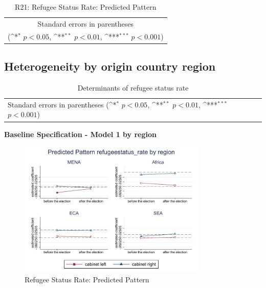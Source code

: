 \documentclass[10pt,a4paper]{scrartcl}
\begin{document}
\begin{table}[!ht]\centering
	\footnotesize
	\renewcommand{\arraystretch}{1.15}
	\def\sym#1{\ifmmode^{#1}\else\(^{#1}\)\fi}
	\caption{R21: Refugee Status Rate: Predicted Pattern}
	\begin{tabular}{l*{2}{c}}
		\hline\hline
		
		\hline\hline
		\multicolumn{3}{c}{\footnotesize Standard errors in parentheses} \\
		\multicolumn{3}{c}{\footnotesize (\sym{*} \(p<0.05\), \sym{**} \(p<0.01\), \sym{***} \(p<0.001\))} \\
	\end{tabular}
\end{table}


\clearpage
\FloatBarrier
\subsection{Heterogeneity by origin country region}
\begin{table}[!ht]\centering
	\renewcommand{\arraystretch}{1.25}
	\small
	\def\sym#1{\ifmmode^{#1}\else\(^{#1}\)\fi}
	\caption{Determinants of refugee status rate}
	\begin{tabular}{l*{4}{c}}
		\hline\hline
		
		\hline\hline
		\multicolumn{5}{l}{\footnotesize Standard errors in parentheses (\sym{*} \(p<0.05\), \sym{**} \(p<0.01\), \sym{***} \(p<0.001\))}\\
	\end{tabular}
\end{table}

\clearpage
\textbf{Baseline Specification - Model 1 by region}
\begin{figure}[!ht]
	\centering
	\includegraphics[width=0.8\textwidth]{figures_edited/refugeestatus_rate_graph1_by_region.pdf}
	\caption{Refugee Status Rate: Predicted Pattern}
\end{figure}
\end{document}
